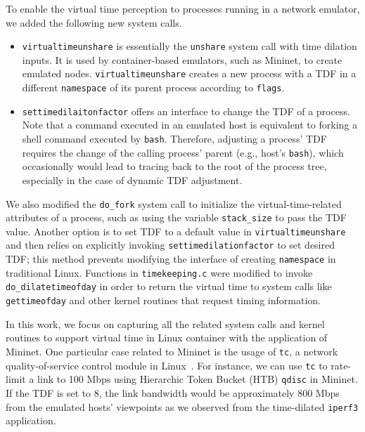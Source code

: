 To enable the virtual time perception to processes running in a network emulator, we added the following new system calls.
\begin{itemize}
    \item \texttt{virtualtimeunshare} is essentially the \texttt{unshare} system call with time dilation inputs.
        It is used by container-based emulators, such as Mininet, to create emulated nodes.
        \texttt{virtualtimeunshare} creates a new process with a TDF in a different \texttt{namespace} of its parent process according to \texttt{flags}.
    \item \texttt{settimedilaitonfactor} offers an interface to change the TDF of a process.
        Note that a command executed in an emulated host is equivalent to forking a shell command executed by \texttt{bash}. 
        Therefore, adjusting a process' TDF requires the change of the calling process' parent (e.g., host's \texttt{bash}),
        which occasionally would lead to tracing back to the root of the process tree, especially in the case of dynamic TDF adjustment. 
\end{itemize}

We also modified the \texttt{do\_fork} system call to initialize the virtual-time-related attributes of a process,
such as using the variable \texttt{stack\_size} to pass the TDF value. 
Another option is to set TDF to a default value in \texttt{virtualtimeunshare} and
then relies on explicitly invoking \texttt{settimedilationfactor} to set desired TDF;
this method prevents modifying the interface of creating \texttt{namespace} in traditional Linux. 
Functions in \texttt{timekeeping.c} were modified to invoke \texttt{do\_dilatetimeofday}
in order to return the virtual time to system calls like \texttt{gettimeofday} and other kernel routines that request timing information.


In this work, we focus on capturing all the related system calls and kernel routines to support virtual time in Linux container with the application of Mininet. 
One particular case related to Mininet is the usage of \texttt{tc}, a network quality-of-service control module in Linux~\cite{TrafficControl}. 
For instance, we can use \texttt{tc} to rate-limit a link to 100 Mbps using Hierarchic Token Bucket (HTB) \texttt{qdisc} in Mininet. If the TDF is set to 8, the link bandwidth would be approximately 800 Mbps from the emulated hosts' viewpoints as we observed from the time-dilated \texttt{iperf3} application.

